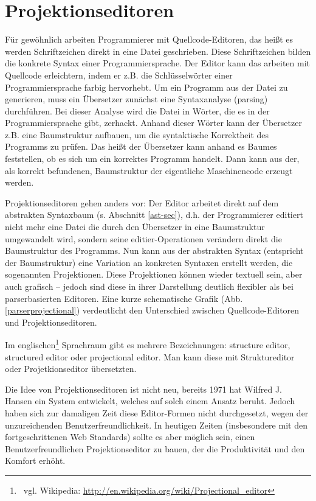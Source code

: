  
\section{Projektionseditoren}\label{Projektionseditoren-sec}
 
Für gewöhnlich arbeiten Programmierer mit Quellcode-Editoren, das heißt es werden Schriftzeichen direkt in eine Datei geschrieben. Diese Schriftzeichen bilden die konkrete Syntax einer Programmiersprache. Der Editor kann das arbeiten mit Quellcode erleichtern, indem er z.B. die Schlüsselwörter einer Programmiersprache farbig hervorhebt. Um ein Programm aus der Datei zu generieren, muss ein Übersetzer zunächst eine Syntaxanalyse (parsing) durchführen. Bei dieser Analyse wird die Datei in Wörter, die es in der Programmiersprache gibt, zerhackt. Anhand dieser Wörter kann der Übersetzer z.B. eine Baumstruktur aufbauen, um die syntaktische Korrektheit des Programms zu prüfen. Das heißt der Übersetzer kann anhand es Baumes feststellen, ob es sich um ein korrektes Programm handelt. Dann kann aus der, als korrekt befundenen, Baumstruktur der eigentliche Maschinencode erzeugt werden.

 
Projektionseditoren gehen anders vor: Der Editor arbeitet direkt auf dem abstrakten Syntaxbaum (s. Abschnitt \ref{ast-sec}), d.h. der Programmierer editiert nicht mehr eine Datei die durch den Übersetzer in eine Baumstruktur umgewandelt wird, sondern seine editier-Operationen verändern direkt die Baumstruktur des Programms. \citep[S.~68]{Voelter} Nun kann aus der abstrakten Syntax (entspricht der Baumstruktur) eine Variation an konkreten Syntaxen erstellt werden, die sogenannten Projektionen. Diese Projektionen können wieder textuell sein, aber auch grafisch -- jedoch sind diese in ihrer Darstellung deutlich flexibler als bei parserbasierten Editoren. Eine kurze schematische Grafik (Abb. \ref{parserprojectional}) verdeutlicht den Unterschied zwischen Quellcode-Editoren und Projektionseditoren.

 
Im englischen\footnote{~vgl. Wikipedia: \url{http://en.wikipedia.org/wiki/Projectional\_editor}} Sprachraum gibt es mehrere Bezeichnungen: structure editor, structured editor oder projectional editor. Man kann diese mit Struktureditor oder Projetkionseditor übersetzten.

 
Die Idee von Projektionseditoren ist nicht neu, bereits 1971 hat Wilfred J. Hansen ein System entwickelt, welches auf solch einem Ansatz beruht. Jedoch haben sich zur damaligen Zeit diese Editor-Formen nicht durchgesetzt, wegen der unzureichenden Benutzerfreundlichkeit. \citep[S.~91]{Gomolka} In heutigen Zeiten (insbesondere mit den fortgeschrittenen Web Standards) sollte es aber möglich sein, einen Benutzerfreundlichen Projektionseditor zu bauen, der die Produktivität und den Komfort erhöht.

